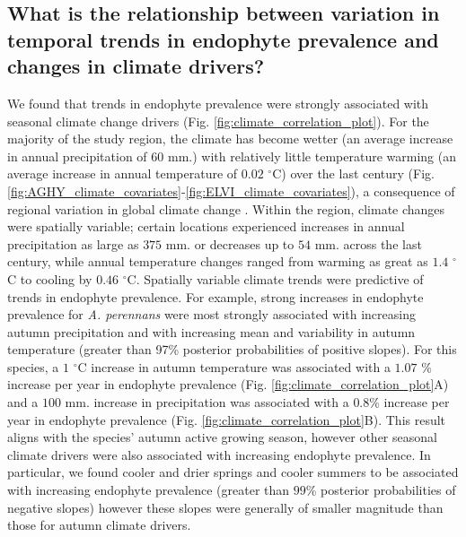 \documentclass[11pt]{article}
\let\cite\citep
\begin{document}
\subsection*{What is the relationship between variation in temporal trends in endophyte prevalence and changes in climate drivers?}
We found that trends in endophyte prevalence were strongly associated with seasonal climate change drivers (Fig. \ref{fig:climate_correlation_plot}).
For the majority of the study region, the climate has become wetter (an average increase in annual precipitation of $60$ mm.) with relatively little temperature warming (an average increase in annual temperature of $0.02$ $^{\circ}$C) over the last century (Fig. \ref{fig:AGHY_climate_covariates}-\ref{fig:ELVI_climate_covariates}), a consequence of regional variation in global climate change \cite{ipcc_2021}. 
Within the region, climate changes were spatially variable; certain locations experienced increases in annual precipitation as large as $375$ mm. or decreases up to $54$ mm. across the last century, while annual temperature changes ranged from warming as great as $1.4$ $^{\circ}$C to cooling by $0.46$ $^{\circ}$C.
Spatially variable climate trends were predictive of trends in endophyte prevalence.
For example, strong increases in endophyte prevalence for \emph{A. perennans} were most strongly associated with increasing autumn precipitation and with increasing mean and variability in autumn temperature (greater than 97\% posterior probabilities of positive slopes).
For this species, a $1$ $^{\circ}$C increase in autumn temperature was associated with a $1.07$ \% increase per year in endophyte prevalence (Fig. \ref{fig:climate_correlation_plot}A) and a $100$ mm. increase in precipitation was associated with a $0.8$\% increase per year in endophyte prevalence (Fig. \ref{fig:climate_correlation_plot}B).
This result aligns with the species' autumn active growing season, however other seasonal climate drivers were also associated with increasing endophyte prevalence. 
In particular, we found cooler and drier springs and cooler summers to be associated with increasing endophyte prevalence (greater than $99$\% posterior probabilities of negative slopes) however these slopes were generally of smaller magnitude than those for autumn climate drivers.
\end{document}
